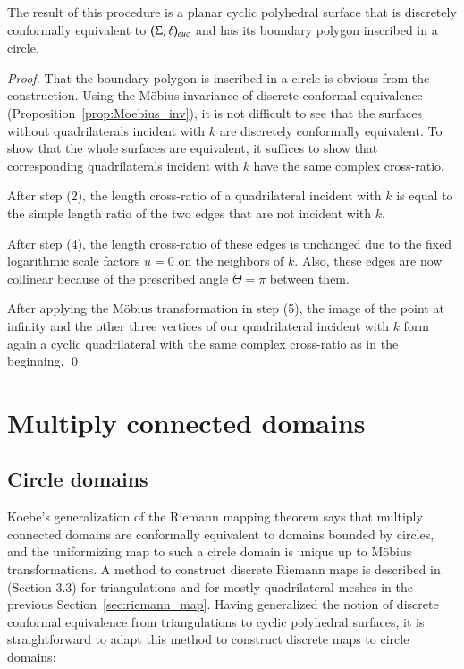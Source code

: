 \documentclass[Thesis]{subfiles}
\begin{document}
\begin{proposition}
  \label{prop:riemann_map}
  The result of this procedure is a planar cyclic polyhedral surface
  that is discretely conformally equivalent to $(\Sigma, \ell)_{\euc}$
  and has its boundary polygon inscribed in a circle.
\end{proposition}

\begin{proof}
  That the boundary polygon is inscribed in a circle is obvious from
  the construction.  Using the M{\"o}bius invariance of discrete
  conformal equivalence (Proposition~\ref{prop:Moebius_inv}), it is
  not difficult to see that the surfaces without quadrilaterals
  incident with $k$ are discretely conformally equivalent. To show
  that the whole surfaces are equivalent, it suffices to show that
  corresponding quadrilaterals incident with $k$ have the same complex
  cross-ratio.

  After step (2), the length cross-ratio of a quadrilateral incident with
  $k$ is equal to the simple length ratio of the two edges that are
  not incident with $k$. 

  After step (4), the length cross-ratio of these edges is unchanged due
  to the fixed logarithmic scale factors $u=0$ on the neighbors of
  $k$. Also, these edges are now collinear because of the prescribed
  angle $\Theta=\pi$ between them.

  After applying the M{\"o}bius transformation in step (5), the image of
  the point at infinity and the other three vertices of our
  quadrilateral incident with $k$ form again a cyclic quadrilateral
  with the same complex cross-ratio as in the beginning.
  \qed
\end{proof}

\section{Multiply connected domains}
\label{sec:multiply_connected}

\subsection{Circle domains}
\label{sec:circle_domains}

Koebe's generalization of the Riemann mapping theorem says that
multiply connected domains are conformally equivalent to domains
bounded by circles, and the uniformizing map to such a circle domain
is unique up to M{\"o}bius transformations. A method to construct
discrete Riemann maps is described in~\cite{BPS2015:dconf} (Section
3.3) for triangulations and for mostly quadrilateral meshes in
the previous Section~\ref{sec:riemann_map}. Having generalized the
notion of discrete conformal equivalence from triangulations to cyclic
polyhedral surfaces, it is straightforward to adapt this method to
construct discrete maps to circle domains: 
\end{document}
